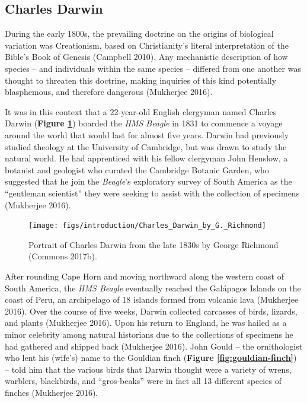 \documentclass[
]{book}
\begin{document}
\hypertarget{charles-darwin}{%
\subsection{Charles Darwin}\label{charles-darwin}}

During the early 1800s, the prevailing doctrine on the origins of biological variation was Creationism, based on Christianity's literal interpretation of the Bible's Book of Genesis (Campbell 2010). Any mechanistic description of how species -- and individuals within the same species -- differed from one another was thought to threaten this doctrine, making inquiries of this kind potentially blasphemous, and therefore dangerous (Mukherjee 2016).

It was in this context that a 22-year-old English clergyman named Charles Darwin (\textbf{Figure \ref{fig:charles-darwin-young-portrait}}) boarded the \emph{HMS Beagle} in 1831 to commence a voyage around the world that would last for almost five years. Darwin had previously studied theology at the University of Cambridge, but was drawn to study the natural world. He had apprenticed with his fellow clergyman John Henslow, a botanist and geologist who curated the Cambridge Botanic Garden, who suggested that he join the \emph{Beagle}'s exploratory survey of South America as the ``gentleman scientist'' they were seeking to assist with the collection of specimens (Mukherjee 2016).



\begin{figure}

{\centering \texttt{[image: figs/introduction/Charles\_Darwin\_by\_G.\_Richmond]} 

}

\caption{Portrait of Charles Darwin from the late 1830s by George Richmond (Commons 2017b).}\label{fig:charles-darwin-young-portrait}
\end{figure}

After rounding Cape Horn and moving northward along the western coast of South America, the \emph{HMS Beagle} eventually reached the Galápagos Islands on the coast of Peru, an archipelago of 18 islands formed from volcanic lava (Mukherjee 2016). Over the course of five weeks, Darwin collected carcasses of birds, lizards, and plants (Mukherjee 2016). Upon his return to England, he was hailed as a minor celebrity among natural historians due to the collections of specimens he had gathered and shipped back (Mukherjee 2016). John Gould -- the ornithologist who lent his (wife's) name to the Gouldian finch (\textbf{Figure \ref{fig:gouldian-finch}}) -- told him that the various birds that Darwin thought were a variety of wrens, warblers, blackbirds, and ``gros-beaks'' were in fact all 13 different species of finches (Mukherjee 2016).
\end{document}
